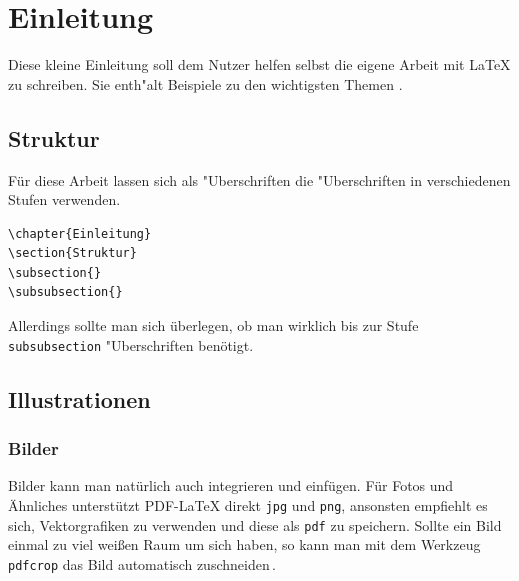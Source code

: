 \chapter{Einleitung}

Diese kleine Einleitung soll dem Nutzer helfen selbst die eigene Arbeit mit \LaTeX{} zu schreiben. Sie enth"alt Beispiele zu den wichtigsten Themen .

\blindtext

\section{Struktur}

Für diese Arbeit lassen sich als "Uberschriften die "Uberschriften in verschiedenen Stufen verwenden.

\begin{verbatim}
\chapter{Einleitung}
\section{Struktur}
\subsection{}
\subsubsection{}
\end{verbatim}

Allerdings sollte man sich überlegen, ob man wirklich bis zur Stufe \verb|subsubsection| "Uberschriften benötigt.



\section{Illustrationen}

\blindtext

\blindtext

\subsection{Bilder}

Bilder kann man natürlich auch integrieren und einfügen. Für Fotos und Ähnliches unterstützt PDF-\LaTeX{} direkt \verb|jpg| und \verb|png|, ansonsten empfiehlt es sich, Vektorgrafiken zu verwenden und diese als \verb|pdf| zu speichern. Sollte ein Bild einmal zu viel weißen Raum um sich haben, so kann man mit dem Werkzeug \verb|pdfcrop| das Bild automatisch zuschneiden\,\cite{pdfcrop}.

